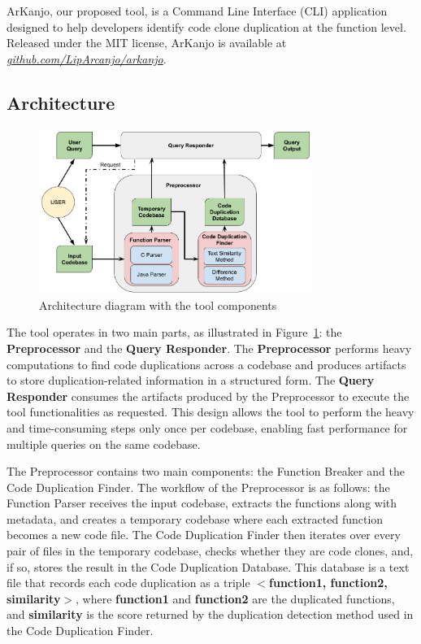\documentclass[conference]{IEEEtran}
\begin{document}
ArKanjo, our proposed tool, is a Command Line Interface (CLI) application designed to
help developers identify code clone duplication at the function level. Released under the
MIT license, ArKanjo is available at \textit{\url{github.com/LipArcanjo/arkanjo}}.

\subsection{Architecture}

\begin{figure}[ht]
\centering
\includegraphics[width=3.5in]{fig/diagrama_mestrado.png}
\caption{Architecture diagram with the tool components}
\label{fig:diagram}
\end{figure}

The tool operates in two main parts, as illustrated in Figure~\ref{fig:diagram}: the \textbf{Preprocessor} and the \textbf{Query Responder}. 
The \textbf{Preprocessor} performs heavy computations to find code 
duplications across a codebase and produces artifacts to store duplication-related information 
in a structured form. The \textbf{Query Responder} consumes the artifacts produced 
by the Preprocessor to execute the tool functionalities as requested. This design allows the 
tool to perform the heavy and time-consuming steps only once per codebase, enabling fast performance 
for multiple queries on the same codebase.

The Preprocessor contains two main components: the Function Breaker and the Code Duplication Finder. 
The workflow of the Preprocessor is as follows: the Function Parser receives the input codebase,
extracts the functions along with metadata, and creates a temporary codebase where each extracted 
function becomes a new code file. The Code Duplication Finder then iterates over every pair of files 
in the temporary codebase, checks whether they are code clones, and, if so, stores the result in 
the Code Duplication Database. This database is a text file that records each code duplication as a triple 
\textbf{$<$function1, function2, similarity$>$}, where \textbf{function1} and \textbf{function2} are the 
duplicated functions, and \textbf{similarity} is the score returned by the duplication detection method 
used in the Code Duplication Finder.
\end{document}
